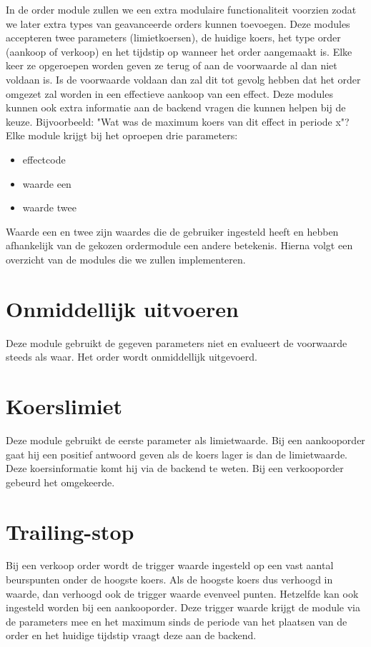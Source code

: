 In de order module zullen we een extra modulaire functionaliteit voorzien zodat we later extra types van geavanceerde orders kunnen toevoegen.
Deze modules accepteren twee parameters (limietkoersen), de huidige koers, het type order (aankoop of verkoop) en het tijdstip op wanneer het order aangemaakt is. Elke keer ze opgeroepen worden geven ze terug of aan de voorwaarde al dan niet voldaan is. Is de voorwaarde voldaan dan zal dit tot gevolg hebben dat het order omgezet zal worden in een effectieve aankoop van een effect.
Deze modules kunnen ook extra informatie aan de backend vragen die kunnen helpen bij de keuze. Bijvoorbeeld: "Wat was de maximum koers van dit effect in periode x"?
Elke module krijgt bij het oproepen drie parameters:
\begin{itemize}
\item{effectcode}
\item{waarde een}
\item{waarde twee}
\end{itemize}

Waarde een en twee zijn waardes die de gebruiker ingesteld heeft en hebben afhankelijk van de gekozen ordermodule een andere betekenis.
Hierna volgt een overzicht van de modules die we zullen implementeren.

\section{Onmiddellijk uitvoeren}
Deze module gebruikt de gegeven parameters niet en evalueert de voorwaarde steeds als waar. Het order wordt onmiddellijk uitgevoerd.

\section{Koerslimiet}
Deze module gebruikt de eerste parameter als limietwaarde. Bij een aankooporder gaat hij een positief antwoord geven als de koers lager is dan de limietwaarde. Deze koersinformatie komt hij via de backend te weten. Bij een verkooporder gebeurd het omgekeerde. 

\section{Trailing-stop}
Bij een verkoop order wordt de trigger waarde ingesteld op een vast aantal beurspunten onder de hoogste koers. Als de hoogste koers dus verhoogd in waarde, dan verhoogd ook de trigger waarde evenveel punten. Hetzelfde kan ook ingesteld worden bij een aankooporder. Deze trigger waarde krijgt de module via de parameters mee en het maximum sinds de periode van het plaatsen van de order en het huidige tijdstip vraagt deze aan de backend.

